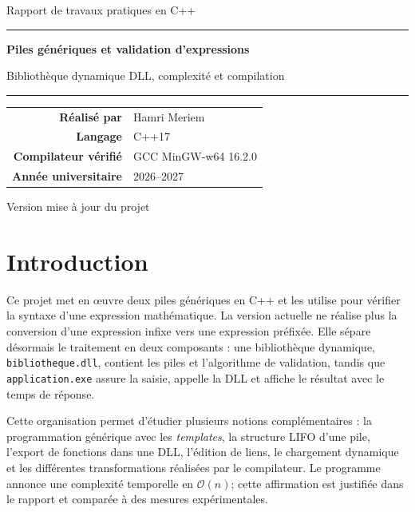 \documentclass[11pt,a4paper]{article}
\newcommand{\fichier}[1]{\texttt{#1}}
\newcommand{\complexite}[1]{\ensuremath{\mathcal{O}(#1)}}
\begin{document}
\begin{titlepage}
  \centering
  \vspace*{2.0cm}
  {\Large Rapport de travaux pratiques en C++\par}
  \vspace{1.0cm}
  {\color{bleu}\rule{0.85\textwidth}{1.2pt}\par}
  \vspace{0.8cm}
  {\Huge\bfseries Piles génériques et validation d'expressions\par}
  \vspace{0.35cm}
  {\LARGE Bibliothèque dynamique DLL, complexité et compilation\par}
  \vspace{0.8cm}
  {\color{bleu}\rule{0.85\textwidth}{1.2pt}\par}
  \vfill
  \begin{tabular}{rl}
    \textbf{Réalisé par} & Hamri Meriem \\
    \textbf{Langage} & C++17 \\
    \textbf{Compilateur vérifié} & GCC MinGW-w64 16.2.0 \\
    \textbf{Année universitaire} & 2026--2027
  \end{tabular}
  \vfill
  {\large Version mise à jour du projet\par}
\end{titlepage}

\tableofcontents
\newpage

\section{Introduction}

Ce projet met en œuvre deux piles génériques en C++ et les utilise pour vérifier la syntaxe d'une expression mathématique. La version actuelle ne réalise plus la conversion d'une expression infixe vers une expression préfixée. Elle sépare désormais le traitement en deux composants : une bibliothèque dynamique, \fichier{bibliotheque.dll}, contient les piles et l'algorithme de validation, tandis que \fichier{application.exe} assure la saisie, appelle la DLL et affiche le résultat avec le temps de réponse.

Cette organisation permet d'étudier plusieurs notions complémentaires : la programmation générique avec les \textit{templates}, la structure LIFO d'une pile, l'export de fonctions dans une DLL, l'édition de liens, le chargement dynamique et les différentes transformations réalisées par le compilateur. Le programme annonce une complexité temporelle en \complexite{n}; cette affirmation est justifiée dans le rapport et comparée à des mesures expérimentales.
\end{document}

